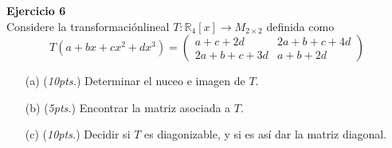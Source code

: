 \documentclass{article}
\newenvironment{problem}[2][Ejercicio]
    { \begin{mdframed}[backgroundcolor=gray!20] \textbf{#1 #2} \\}
    {  \end{mdframed}}
\begin{document}
\begin{problem}{6}
    Considere la transformaciónlineal $T: \mathbb{R}_4[x] \to M_{2\times 2}$ definida como
    $$
    T(a+bx+cx^2+dx^3) = \begin{pmatrix} a+c+2d & 2a+b+c+4d \\ 2a+b+c+3d & a+b+2d \end{pmatrix}
    $$
    \begin{itemize}
        \item[(a)] (\textit{10pts.}) Determinar el nuceo e imagen de $T$.
        \item[(b)] (\textit{5pts.}) Encontrar la matriz asociada a $T$.
        \item[(c)] (\textit{10pts.}) Decidir si $T$ es diagonizable, y si es así dar la matriz diagonal.
    \end{itemize}
\end{problem}
\end{document}
